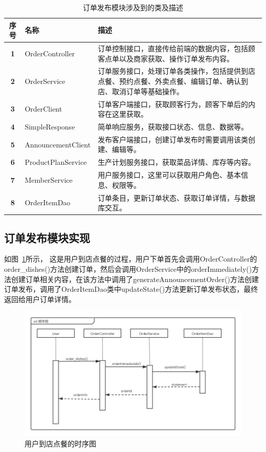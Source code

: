 \begin{table}[htbp!]\footnotesize
    \centering
    \caption{订单发布模块涉及到的类及描述}
    \vspace{2mm}
    \begin{tabular}{clp{}}
    \toprule
    \textbf{序号}&\textbf{名称}&\textbf{描述}\\
    \midrule 
    \textbf{1}& OrderController& 订单控制接口，直接传给前端的数据内容，包括顾客点单以及商家获取、操作订单发布内容。\\
    \hline
    \textbf{2}& OrderService& 订单服务接口，处理订单各类操作，包括提供到店点餐、预约点餐、外卖点餐、编辑订单、确认到店、取消订单等基础操作。\\
    \hline
    \textbf{3}& OrderClient& 订单客户端接口，获取顾客行为，顾客下单后的内容在这里获取。\\
    \hline
    \textbf{4}& SimpleResponse& 简单响应服务，获取接口状态、信息、数据等。\\
    \hline
    \textbf{5}& AnnouncementClient& 发布客户端接口，创建订单发布时需要调用该类创建、编辑等。\\
    \hline
    \textbf{6}& ProductPlanService& 生产计划服务接口，获取菜品详情、库存等内容。\\
    \hline
    \textbf{7}& MemberService& 用户服务接口，这里可以获取用户角色、基本信息、权限等。\\
    \hline
    \textbf{8}& OrderItemDao& 订单条目，更新订单状态、获取订单详情，与数据库交互。\\
    \bottomrule
    \end{tabular}
    \label{table:1List}
\end{table}

\subsection{订单发布模块实现}
如图~\ref{fig_order_time}所示，
这是用户到店点餐的过程，用户下单首先会调用OrderController的order\_dishes()方法创建订单，然后会调用OrderService中的orderImmediately()方法创建订单相关内容，在该方法中调用了generateAnnouncementOrder()方法创建订单发布，调用了OrderItemDao类中updateState()方法更新订单发布状态，最终返回给用户订单详情。

\begin{figure}[htbp!]
    \centering
    \includegraphics[width=\linewidth]{FIGs/chapter4/order_time.pdf}
    \caption{用户到店点餐的时序图}\label{fig_order_time}
\end{figure}

